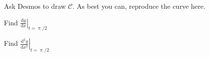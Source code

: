\documentclass[12pt,fleqn]{exam}
\begin{document}
\begin{questions} 
  
  \question[2] Ask Desmos to draw  $\mathcal{C}$. As best you can, reproduce the curve here.
  
  \begin{solution}%
  \end{solution}
  
  \newpage
  \question [2] Find $\displaystyle \left. \frac{\mathrm{d} y}{\mathrm{d} x} \right \vert_{t = \uppi/2}$
    \begin{solution}%
  \end{solution}
  
  \newpage
  
    \question [2] Find $\displaystyle \left. \frac{\mathrm{d}^2  y}{\mathrm{d} x^2} \right \vert_{t = \uppi/2}$
    \begin{solution}[2.5in]
  \end{solution}
  
  
  \end{questions}
  
\end{document}

